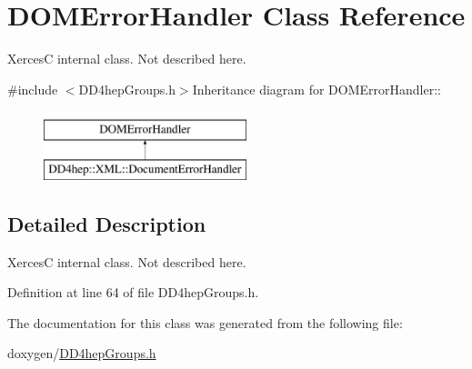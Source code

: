 \hypertarget{class_d_o_m_error_handler}{
\section{DOMErrorHandler Class Reference}
\label{class_d_o_m_error_handler}
}


XercesC internal class. Not described here.  


{\ttfamily \#include $<$DD4hepGroups.h$>$}Inheritance diagram for DOMErrorHandler::\begin{figure}[H]
\begin{center}
\leavevmode
\includegraphics[height=2cm]{class_d_o_m_error_handler}
\end{center}
\end{figure}


\subsection{Detailed Description}
XercesC internal class. Not described here. 

Definition at line 64 of file DD4hepGroups.h.

The documentation for this class was generated from the following file:\begin{DoxyCompactItemize}
\item 
doxygen/\hyperlink{_d_d4hep_groups_8h}{DD4hepGroups.h}\end{DoxyCompactItemize}
